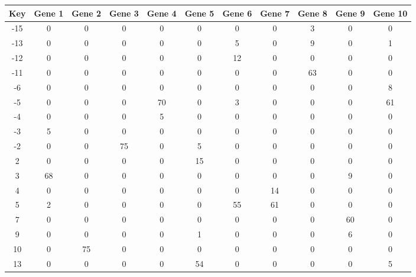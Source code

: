 \begin{tabular}{|c|c|c|c|c|c|c|c|c|c|c|}
\hline
Key & Gene 1 & Gene 2 & Gene 3 & Gene 4 & Gene 5 & Gene 6 & Gene 7 & Gene 8 & Gene 9 & Gene 10 \\
\hline
-15 & 0 & 0 & 0 & 0 & 0 & 0 & 0 & 3 & 0 & 0 \\
-13 & 0 & 0 & 0 & 0 & 0 & 5 & 0 & 9 & 0 & 1 \\
-12 & 0 & 0 & 0 & 0 & 0 & 12 & 0 & 0 & 0 & 0 \\
-11 & 0 & 0 & 0 & 0 & 0 & 0 & 0 & 63 & 0 & 0 \\
-6 & 0 & 0 & 0 & 0 & 0 & 0 & 0 & 0 & 0 & 8 \\
-5 & 0 & 0 & 0 & 70 & 0 & 3 & 0 & 0 & 0 & 61 \\
-4 & 0 & 0 & 0 & 5 & 0 & 0 & 0 & 0 & 0 & 0 \\
-3 & 5 & 0 & 0 & 0 & 0 & 0 & 0 & 0 & 0 & 0 \\
-2 & 0 & 0 & 75 & 0 & 5 & 0 & 0 & 0 & 0 & 0 \\
2 & 0 & 0 & 0 & 0 & 15 & 0 & 0 & 0 & 0 & 0 \\
3 & 68 & 0 & 0 & 0 & 0 & 0 & 0 & 0 & 9 & 0 \\
4 & 0 & 0 & 0 & 0 & 0 & 0 & 14 & 0 & 0 & 0 \\
5 & 2 & 0 & 0 & 0 & 0 & 55 & 61 & 0 & 0 & 0 \\
7 & 0 & 0 & 0 & 0 & 0 & 0 & 0 & 0 & 60 & 0 \\
9 & 0 & 0 & 0 & 0 & 1 & 0 & 0 & 0 & 6 & 0 \\
10 & 0 & 75 & 0 & 0 & 0 & 0 & 0 & 0 & 0 & 0 \\
13 & 0 & 0 & 0 & 0 & 54 & 0 & 0 & 0 & 0 & 5 \\
\hline
\end{tabular}